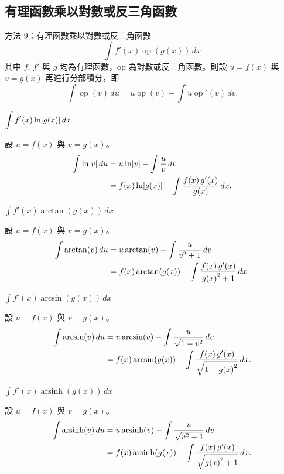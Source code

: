 \documentclass{beamer}
\newcommand{\Left} {\mathopen{}\mathclose\bgroup\left}
\newcommand{\Right}{\aftergroup\egroup\right}
\newcommand{\arsinh}{\operatorname{arsinh}}
\newcommand{\op}  {\operatorname{op}}
\theoremstyle{remark}
\begin{document}
\begin{CJK}{UTF8}{bsmi}
\subsection[有理函數乘以反函數]{有理函數乘以對數或反三角函數}
\begin{frame}{方法 9：有理函數乘以對數或反三角函數}
  \[\int f'(x) \op(g(x))\,dx\]
  其中 $f$, $f'$ 與 $g$ 均為有理函數，op 為對數或反三角函數。則設 $u = f(x)$ 與 $v = g(x)$ 再進行分部積分，即
  \[\int \op(v)\,du = u \op(v) - \int u \op'(v)\,dv.\]
\end{frame}

\begin{frame}{$\displaystyle \int f'(x) \ln \Left| g(x) \Right|\,dx$}
  \begin{solution}
    設 $u = f(x)$ 與 $v = g(x)$。
    \begin{align*}
      \int \ln \Left| v \Right|\,du &= u \ln \Left| v \Right| - \int \frac u v \,dv\\
	&= f(x) \ln \Left| g(x) \Right| - \int \frac{f(x)\,g'(x)}{g(x)}\,dx.
    \end{align*}
  \end{solution}
\end{frame}

\begin{frame}{$\displaystyle \int f'(x) \arctan(g(x))\,dx$}
  \begin{solution}
    設 $u = f(x)$ 與 $v = g(x)$。
    \begin{align*}
      \int \arctan(v)\,du &= u \arctan(v) - \int \frac{u}{v^2 + 1}\,dv\\
	&= f(x) \arctan(g(x)) - \int \frac{f(x)\,g'(x)}{g \Left( x \Right)^2 + 1}\,dx.
    \end{align*}
  \end{solution}
\end{frame}

\begin{frame}{$\displaystyle \int f'(x) \arcsin(g(x))\,dx$}
  \begin{solution}
    設 $u = f(x)$ 與 $v = g(x)$。
    \begin{align*}
      \int \arcsin(v)\,du &= u \arcsin(v) - \int \frac{u}{\sqrt{1 - v^2}}\,dv\\
	&= f(x) \arcsin(g(x)) - \int \frac{f(x)\,g'(x)}{\sqrt{1 - g \Left( x \Right)^2}}\,dx.
    \end{align*}
  \end{solution}
\end{frame}

\begin{frame}{$\displaystyle \int f'(x) \arsinh(g(x))\,dx$}
  \begin{solution}
    設 $u = f(x)$ 與 $v = g(x)$。
    \begin{align*}
      \int \arsinh(v)\,du &= u \arsinh(v) - \int \frac{u}{\sqrt{v^2 + 1}}\,dv\\
	&= f(x) \arsinh(g(x)) - \int \frac{f(x)\,g'(x)}{\sqrt{g \Left( x \Right)^2 + 1}}\,dx.
    \end{align*}
  \end{solution}
\end{frame}


\end{CJK}
\end{document}
